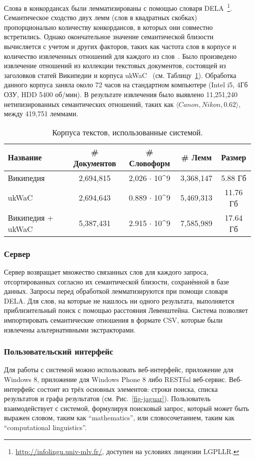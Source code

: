 \documentclass[a4paper,10pt,twoside]{article}
\begin{document}
Слова в конкордансах были лемматизированы с помощью словаря DELA~\footnote{\url{http://infolingu.univ-mlv.fr/}, доступен на условиях лицензии LGPLLR.}. Семантическое сходство двух лемм (слов в квадратных скобках) пропорционально количеству конкордансов, в которых они совместно встретились. Однако окончательное значение семантической близости вычисляется с учетом и других факторов, таких как частота слов в корпусе и количество извлеченных отношений для каждого из слов~\cite{panchenko2012konvens}. Было произведено извлечение отношений из коллекции текстовых документов, состоящей из заголовков статей Википедии и корпуса ukWaC~\cite{baroni2009wacky} (см. Таблицу~\ref{tbl:corpora}). Обработка данного корпуса заняла около 72 часов на стандартном компьютере (Intel i5, 4Гб ОЗУ, HDD 5400 об/мин). В результате извлечения было выявлено 11,251,240 нетипизированных семантических отношений, таких как  $\langle Canon, Nikon, 0.62 \rangle$, между 419,751 леммами. 


\begin{table}
\centering
\footnotesize
\begin{tabular}{|l|c|c|c|c|}
  \hline              
  Название & \# Документов & \# Словоформ & \# Лемм &  Размер \\ \hline         \hline           
  Википедия & 2,694,815 & 2,026 $\cdot$ 10^9 & 3,368,147 & 5.88 Гб \\
  ukWaC & 2,694,643 & 0.889 $\cdot$ 10^9 & 5,469,313 & 11.76 Гб \\ 
  Википедия + ukWaC & 5,387,431 & 2.915 $\cdot$ 10^9 & 7,585,989 & 17.64 Гб\\
  \hline  
\end{tabular}
\caption{Корпуса текстов, использованные системой.}
\label{tbl:corpora}
\end{table}

\subsubsection{Сервер} Сервер возвращает множество связанных слов для каждого запроса, отсортированных согласно их семантической близости, сохранённой в базе данных. Запросы перед обработкой лемматизируются при помощи словаря DELA. Для слов, на которые не нашлось ни одного результата, выполняется приблизительный поиск с помощью расстояния Левенштейна. Система позволяет импортировать семантические отношения в формате CSV, которые были извлечены альтернативными экстракторами.

\subsubsection{Пользовательский интерфейс} Для работы с системой можно использовать веб-интерфейс, приложение для Windows 8, приложение для Windows Phone 8 либо RESTful веб-сервис. Веб-интерфейс состоит из трёх основных элементов: строки поиска, списка результатов и графа результатов (см. Рис.~\ref{fig-jaguar}). Пользователь взаимодействует с системой, формулируя поисковый запрос, который может быть выражен словом, таким как ``mathematics'', или словосочетанием, таким как ``computational linguistics''. 
\end{document}
